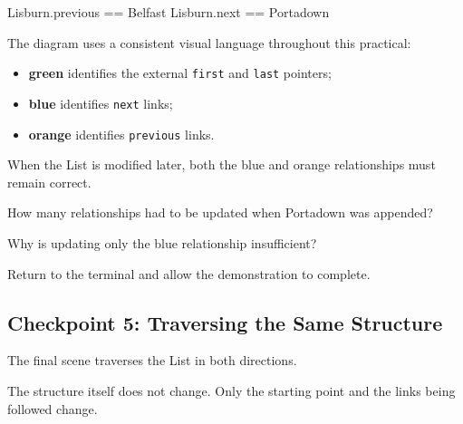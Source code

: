 \documentclass{csc2059practical}
\begin{document}
\begin{cppcode}
Lisburn.previous == Belfast
Lisburn.next     == Portadown
\end{cppcode}

\begin{infobox}
The diagram uses a consistent visual language throughout this practical:

\begin{itemize}
    \item \textcolor{listboundary}{\textbf{green}} identifies the external
          \texttt{first} and \texttt{last} pointers;
    \item \textcolor{listnext}{\textbf{blue}} identifies
          \texttt{next} links;
    \item \textcolor{listprevious}{\textbf{orange}} identifies
          \texttt{previous} links.
\end{itemize}

When the List is modified later, both the blue and orange relationships must remain correct.
\end{infobox}

\begin{reflectionbox}
How many relationships had to be updated when Portadown was appended?

Why is updating only the blue relationship insufficient?
\end{reflectionbox}

Return to the terminal and allow the demonstration to complete.

\subsection{Checkpoint 5: Traversing the Same Structure}

The final scene traverses the List in both directions.

The structure itself does not change. Only the starting point and the links being followed change.
\end{document}
